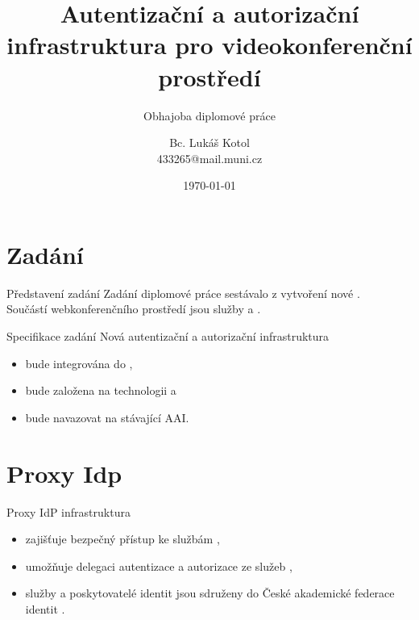 \documentclass[
]{beamer}
\begin{document}
\title[Obhajoba diplomové práce]{Autentizační a autorizační infrastruktura pro videokonferenční prostředí}
\subtitle[Short Presentation Subtitle]{Obhajoba diplomové práce}
\author[L.\,Kotol]{Bc. Lukáš Kotol \\ 433265@mail.muni.cz}
\date{\today}
\subject{Presentation Subject}

\begin{frame}[plain]
\maketitle
\end{frame}

\section[Zadání]{Zadání}

\begin{frame}{Představení zadání}{}
Zadání diplomové práce sestávalo z vytvoření nové . 
\\
\medskip
Součástí webkonferenčního prostředí jsou služby
 a .

\end{frame}

\begin{frame}{Specifikace zadání}
Nová autentizační a autorizační infrastruktura 
\begin{itemize}
  \item bude integrována do ,
  \item bude založena na technologii  a
  \item bude navazovat na stávající AAI. 
\end{itemize}
\end{frame}

\section[Proxy Idp]{Proxy Idp}
\begin{frame}{Proxy IdP infrastruktura}
\begin{itemize}
    \item zajišťuje bezpečný přístup ke službám ,
    \item umožňuje delegaci autentizace a autorizace ze služeb ,
    \item služby a poskytovatelé identit jsou sdruženy do České akademické federace identit .

\end{itemize}
\end{frame}
\end{document}
